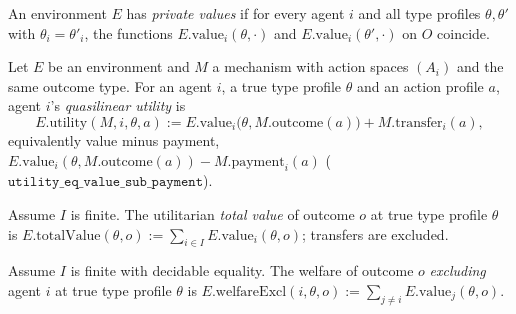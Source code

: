 \begin{definition}\label{def:MathEconLib.Mechanism.QuasilinearEnvironment.IsPrivateValues}\leanok
{}
An environment $E$ has \emph{private values} if for every agent $i$ and all type profiles $\theta,\theta'$ with $\theta_i=\theta'_i$, the functions $E.\mathrm{value}_i(\theta,\cdot)$ and $E.\mathrm{value}_i(\theta',\cdot)$ on $O$ coincide.
\end{definition}

\begin{definition}\label{def:MathEconLib.Mechanism.QuasilinearEnvironment.utility}\leanok
{}
Let $E$ be an environment and $M$ a mechanism with action spaces $(A_i)$ and the same outcome type. For an agent $i$, a true type profile $\theta$ and an action profile $a$, agent $i$'s \emph{quasilinear utility} is
\[
E.\mathrm{utility}(M,i,\theta,a):=E.\mathrm{value}_i\bigl(\theta,M.\mathrm{outcome}(a)\bigr)+M.\mathrm{transfer}_i(a),
\]
equivalently value minus payment, $E.\mathrm{value}_i(\theta,M.\mathrm{outcome}(a))-M.\mathrm{payment}_i(a)$ ($\texttt{utility\_eq\_value\_sub\_payment}$).
\end{definition}

\begin{definition}\label{def:MathEconLib.Mechanism.QuasilinearEnvironment.totalValue}\leanok
{}
Assume $I$ is finite. The utilitarian \emph{total value} of outcome $o$ at true type profile $\theta$ is $E.\mathrm{totalValue}(\theta,o):=\sum_{i\in I}E.\mathrm{value}_i(\theta,o)$; transfers are excluded.
\end{definition}

\begin{definition}\label{def:MathEconLib.Mechanism.QuasilinearEnvironment.welfareExcl}\leanok
{}
Assume $I$ is finite with decidable equality. The welfare of outcome $o$ \emph{excluding} agent $i$ at true type profile $\theta$ is $E.\mathrm{welfareExcl}(i,\theta,o):=\sum_{j\neq i}E.\mathrm{value}_j(\theta,o)$.
\end{definition}

